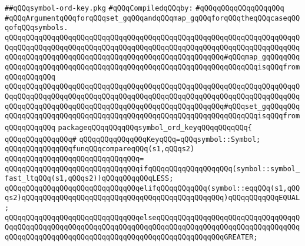 \label{src/app/makelib/stuff/symbol-ord-key.pkg}
\verb|##qQQqsymbol-ord-key.pkg|\newline
\newline
\verb|#qQQqCompiledqQQqby:|\newline
\verb|#qQQqqQQqqQQqqQQqqQQq|\newline
\newline
\newline
\verb|#qQQqArgumentqQQqforqQQqset_gqQQqandqQQqmap_gqQQqforqQQqtheqQQqcaseqQQqofqQQqsymbols.|\newline
\newline
\verb|qQQqqQQqqQQqqQQqqQQqqQQqqQQqqQQqqQQqqQQqqQQqqQQqqQQqqQQqqQQqqQQqqQQqqQQqqQQqqQQqqQQqqQQqqQQqqQQqqQQqqQQqqQQqqQQqqQQqqQQqqQQqqQQqqQQqqQQqqQQqqQQqqQQqqQQqqQQqqQQqqQQqqQQqqQQqqQQqqQQqqQQqqQQqqQQq#qQQqmap_gqQQqqQQqqQQqqQQqqQQqqQQqqQQqqQQqqQQqqQQqqQQqqQQqqQQqqQQqqQQqqQQqqQQqisqQQqfromqQQqqQQqqQQq|\newline
\verb|qQQqqQQqqQQqqQQqqQQqqQQqqQQqqQQqqQQqqQQqqQQqqQQqqQQqqQQqqQQqqQQqqQQqqQQqqQQqqQQqqQQqqQQqqQQqqQQqqQQqqQQqqQQqqQQqqQQqqQQqqQQqqQQqqQQqqQQqqQQqqQQqqQQqqQQqqQQqqQQqqQQqqQQqqQQqqQQqqQQqqQQqqQQqqQQq#qQQqset_gqQQqqQQqqQQqqQQqqQQqqQQqqQQqqQQqqQQqqQQqqQQqqQQqqQQqqQQqqQQqqQQqqQQqisqQQqfromqQQqqQQqqQQq|\newline
\newline
\verb|packageqQQqqQQqqQQqsymbol_ord_keyqQQqqQQqqQQq{|\newline
\verb|qQQqqQQqqQQqqQQq#|\newline
\verb|qQQqqQQqqQQqqQQqKeyqQQq=qQQqsymbol::Symbol;|\newline
\newline
\verb|qQQqqQQqqQQqqQQqfunqQQqcompareqQQq(s1,qQQqs2)|\newline
\verb|qQQqqQQqqQQqqQQqqQQqqQQqqQQqqQQq=|\newline
\verb|qQQqqQQqqQQqqQQqqQQqqQQqqQQqqQQqifqQQqqQQqqQQqqQQqqQQq(symbol::symbol_fast_ltqQQq(s1,qQQqs2))qQQqqQQqqQQqLESS;|\newline
\verb|qQQqqQQqqQQqqQQqqQQqqQQqqQQqqQQqelifqQQqqQQqqQQq(symbol::eqqQQq(s1,qQQqs2)qQQqqQQqqQQqqQQqqQQqqQQqqQQqqQQqqQQqqQQqqQQqqQQq)qQQqqQQqqQQqEQUAL;|\newline
\verb|qQQqqQQqqQQqqQQqqQQqqQQqqQQqqQQqelseqQQqqQQqqQQqqQQqqQQqqQQqqQQqqQQqqQQqqQQqqQQqqQQqqQQqqQQqqQQqqQQqqQQqqQQqqQQqqQQqqQQqqQQqqQQqqQQqqQQqqQQqqQQqqQQqqQQqqQQqqQQqqQQqqQQqqQQqqQQqqQQqqQQqqQQqqQQqGREATER;|\newline
